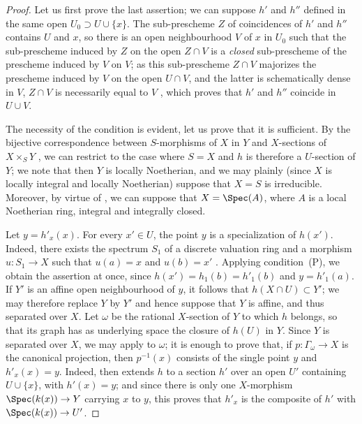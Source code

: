 \begin{proof}
Let us first prove the last assertion;
we can suppose $h'$ and $h''$ defined in the same open $U_0\supset U\cup\{x\}$.
The sub-prescheme $Z$ of coincidences of $h'$ and $h''$  contains $U$ and $x$, so there is an open neighbourhood $V$ of $x$ in $U_0$ such that the sub-prescheme induced by $Z$ on the open $Z\cap V$ is a \emph{closed} sub-prescheme of the prescheme induced by $V$ on $V$;
as this sub-prescheme $Z\cap V$ majorizes the prescheme induced by $V$ on the open $U\cap V$, and the latter is schematically dense in $V$, $Z\cap V$ is necessarily equal to $V$ , which proves that $h'$ and $h''$ coincide in $U\cup V$.

The necessity of the condition is evident, let us prove that it is sufficient.
By the bijective correspondence between $S$-morphisms of $X$ in $Y$ and $X$-sections of $X\times_S Y$ , we can restrict to the case where $S=X$ and $h$ is therefore a $U$-section of $Y$;
we note that then $Y$ is locally Noetherian, and we may plainly (since $X$ is locally integral and locally Noetherian) suppose that $X=S$ is irreducible.
Moreover, by virtue of , we can suppose that $X=\Spec(A)$, where $A$ is a local Noetherian ring, integral and integrally closed.

Let $y=h'_x(x)$.
For every $x'\in U$, the point $y$ is a specialization of $h(x')$.
Indeed, there exists the spectrum $S_1$ of a discrete valuation ring and a morphism $u:S_1\to X$ such that $u(a)=x$ and $u(b)=x'$ .
Applying condition~(P), we obtain the assertion at once, since $h(x')=h_1(b)=h'_1(b)$ and $y=h'_1(a)$.
If $Y'$ is an affine open neighbourhood of $y$, it follows that $h(X\cap U)\subset Y'$;
we may therefore replace $Y$ by $Y'$ and hence suppose that $Y$ is affine, and thus separated over $X$.
Let $\omega$ be the rational $X$-section of $Y$ to which $h$ belongs, so that its graph has as underlying space the closure of $h(U)$ in $Y$.
Since $Y$ is separated over $X$, we may apply  to $\omega$;
it is enough to prove that, if $p:\Gamma_\omega\to X$ is the canonical projection, then $p^{-1}(x)$ consists of the single point $y$ and $h'_x(x)=y$.
Indeed,  then extends $h$ to a section $h'$ over an open $U'$ containing $U\cup\{x\}$, with $h'(x)=y$;
and since there is only one $X$-morphism $\Spec(k(x))\to Y$ carrying $x$ to $y$, this proves that $h'_x$ is the composite of $h'$ with $\Spec(k(x))\to U'$.


\end{proof}
